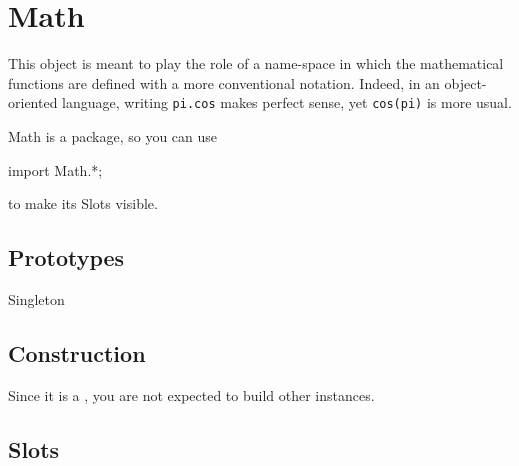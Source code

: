 
\section{Math}

This object is meant to play the role of a name-space in which the
mathematical functions are defined with a more conventional notation.
Indeed, in an object-oriented language, writing \lstinline|pi.cos| makes
perfect sense, yet \lstinline|cos(pi)| is more usual.

Math is a package, so you can use

\begin{urbiscript}
import Math.*;
\end{urbiscript}

to make its Slots visible.


\subsection{Prototypes}
\begin{refObjects}
\item[Singleton]
\end{refObjects}

\subsection{Construction}

Since it is a , you are not expected to build other
instances.

\subsection{Slots}

